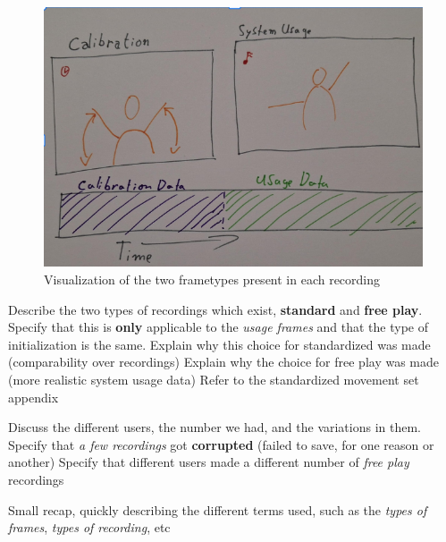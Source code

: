 \begin{figure}[h]
    \centering
    \includegraphics[width=0.7\linewidth]{figures/experimental setup/frame_types.png}
    \caption{Visualization of the two frametypes present in each recording}
    \label{fig:frame_types}
\end{figure}




Describe the two types of recordings which exist, \textbf{standard} and \textbf{free play}.
Specify that this is \textbf{only} applicable to the \textit{usage frames} and that the type of initialization is the same.
Explain why this choice for standardized was made (comparability over recordings)
Explain why the choice for free play was made (more realistic system usage data)
Refer to the standardized movement set appendix

Discuss the different users, the number we had, and the variations in them.
Specify that \textit{a few recordings} got \textbf{corrupted} (failed to save, for one reason or another)
Specify that different users made a different number of \textit{free play} recordings

Small recap, quickly describing the different terms used, such as the \textit{types of frames}, \textit{types of recording}, etc



